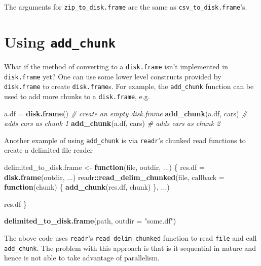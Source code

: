 \documentclass[]{book}
\newenvironment{Shaded}{\begin{snugshade}}{\end{snugshade}}
\newcommand{\CommentTok}[1]{\textcolor[rgb]{0.56,0.35,0.01}{\textit{#1}}}
\newcommand{\ControlFlowTok}[1]{\textcolor[rgb]{0.13,0.29,0.53}{\textbf{#1}}}
\newcommand{\DataTypeTok}[1]{\textcolor[rgb]{0.13,0.29,0.53}{#1}}
\newcommand{\KeywordTok}[1]{\textcolor[rgb]{0.13,0.29,0.53}{\textbf{#1}}}
\newcommand{\NormalTok}[1]{#1}
\newcommand{\OperatorTok}[1]{\textcolor[rgb]{0.81,0.36,0.00}{\textbf{#1}}}
\newcommand{\StringTok}[1]{\textcolor[rgb]{0.31,0.60,0.02}{#1}}
\begin{document}
The arguments for \texttt{zip\_to\_disk.frame} are the same as \texttt{csv\_to\_disk.frame}'s.

\hypertarget{using-add_chunk}{%
\section{\texorpdfstring{Using \texttt{add\_chunk}}{Using add\_chunk}}\label{using-add_chunk}}

What if the method of converting to a \texttt{disk.frame} isn't implemented in \texttt{disk.frame} yet? One can use some lower level constructs provided by \texttt{disk.frame} to create \texttt{disk.frame}s. For example, the \texttt{add\_chunk} function can be used to add more chunks to a \texttt{disk.frame}, e.g.

\begin{Shaded}
\begin{Highlighting}[]
\NormalTok{a.df =}\StringTok{ }\KeywordTok{disk.frame}\NormalTok{() }\CommentTok{# create an empty disk.frame}
\KeywordTok{add_chunk}\NormalTok{(a.df, cars) }\CommentTok{# adds cars as chunk 1}
\KeywordTok{add_chunk}\NormalTok{(a.df, cars) }\CommentTok{# adds cars as chunk 2}
\end{Highlighting}
\end{Shaded}

Another example of using \texttt{add\_chunk} is via \texttt{readr}'s chunked read functions to create a delimited file reader

\begin{Shaded}
\begin{Highlighting}[]
\NormalTok{delimited_to_disk.frame <-}\StringTok{ }\ControlFlowTok{function}\NormalTok{(file, outdir, ...) \{}
\NormalTok{  res.df =}\StringTok{ }\KeywordTok{disk.frame}\NormalTok{(outdir, ...)}
\NormalTok{  readr}\OperatorTok{::}\KeywordTok{read_delim_chunked}\NormalTok{(file, }\DataTypeTok{callback =} \ControlFlowTok{function}\NormalTok{(chunk) \{}
    \KeywordTok{add_chunk}\NormalTok{(res.df, chunk)}
\NormalTok{  \}, ...)}
  
\NormalTok{  res.df}
\NormalTok{\}}

\KeywordTok{delimited_to_disk.frame}\NormalTok{(path, }\DataTypeTok{outdir =} \StringTok{"some.df"}\NormalTok{)}
\end{Highlighting}
\end{Shaded}

The above code uses \texttt{readr}'s \texttt{read\_delim\_chunked} function to read \texttt{file} and call \texttt{add\_chunk}. The problem with this approach is that is it sequential in nature and hence is not able to take advantage of parallelism.
\end{document}
